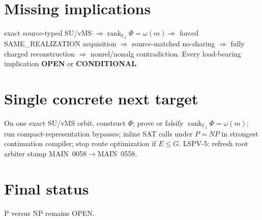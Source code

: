 \documentclass[11pt]{article}
\begin{document}
\section*{Missing implications}
exact source-typed SU/vMS $\Rightarrow\operatorname{rank}_{\mathbb F_2}\Phi=\omega(m)
\Rightarrow$ forced SAME\_REALIZATION acquisition $\Rightarrow$ source-matched no-sharing
$\Rightarrow$ fully charged reconstruction $\Rightarrow$ nonrel/nonalg contradiction.
Every load-bearing implication \textbf{OPEN} or \textbf{CONDITIONAL}.

\section*{Single concrete next target}
On one exact SU/vMS orbit, construct $\Phi$; prove or falsify
$\boxed{\operatorname{rank}_{\mathbb F_2}\Phi=\omega(m)}$;
run compact-representation bypasses; inline SAT calls under $P=NP$ in strongest
continuation compiler; stop route optimization if $E\le G$.
LSPV-5: refresh root arbiter stamp MAIN~0058$\to$MAIN~0558.

\section*{Final status}
P versus NP remains OPEN.

\end{document}
